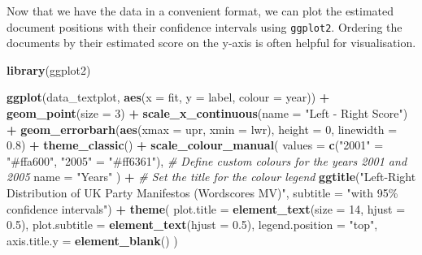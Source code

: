 \documentclass[
]{book}
\newenvironment{Shaded}{\begin{snugshade}}{\end{snugshade}}
\newcommand{\AttributeTok}[1]{\textcolor[rgb]{0.13,0.29,0.53}{#1}}
\newcommand{\CommentTok}[1]{\textcolor[rgb]{0.56,0.35,0.01}{\textit{#1}}}
\newcommand{\DecValTok}[1]{\textcolor[rgb]{0.00,0.00,0.81}{#1}}
\newcommand{\FloatTok}[1]{\textcolor[rgb]{0.00,0.00,0.81}{#1}}
\newcommand{\FunctionTok}[1]{\textcolor[rgb]{0.13,0.29,0.53}{\textbf{#1}}}
\newcommand{\NormalTok}[1]{#1}
\newcommand{\OtherTok}[1]{\textcolor[rgb]{0.56,0.35,0.01}{#1}}
\newcommand{\SpecialCharTok}[1]{\textcolor[rgb]{0.81,0.36,0.00}{\textbf{#1}}}
\newcommand{\StringTok}[1]{\textcolor[rgb]{0.31,0.60,0.02}{#1}}
\begin{document}
Now that we have the data in a convenient format, we can plot the estimated document positions with their confidence intervals using \texttt{ggplot2}. Ordering the documents by their estimated score on the y-axis is often helpful for visualisation.

\begin{Shaded}
\begin{Highlighting}[]
\FunctionTok{library}\NormalTok{(ggplot2)}

\FunctionTok{ggplot}\NormalTok{(data\_textplot, }\FunctionTok{aes}\NormalTok{(}\AttributeTok{x =}\NormalTok{ fit, }\AttributeTok{y =}\NormalTok{ label, }\AttributeTok{colour =}\NormalTok{ year)) }\SpecialCharTok{+}
  \FunctionTok{geom\_point}\NormalTok{(}\AttributeTok{size =} \DecValTok{3}\NormalTok{) }\SpecialCharTok{+}
  \FunctionTok{scale\_x\_continuous}\NormalTok{(}\AttributeTok{name =} \StringTok{"Left {-} Right Score"}\NormalTok{) }\SpecialCharTok{+}
  \FunctionTok{geom\_errorbarh}\NormalTok{(}\FunctionTok{aes}\NormalTok{(}\AttributeTok{xmax =}\NormalTok{ upr, }\AttributeTok{xmin =}\NormalTok{ lwr),}
                 \AttributeTok{height =} \DecValTok{0}\NormalTok{,}
                 \AttributeTok{linewidth =} \FloatTok{0.8}\NormalTok{) }\SpecialCharTok{+}
  \FunctionTok{theme\_classic}\NormalTok{() }\SpecialCharTok{+}
  \FunctionTok{scale\_colour\_manual}\NormalTok{(}
    \AttributeTok{values =} \FunctionTok{c}\NormalTok{(}\StringTok{"2001"} \OtherTok{=} \StringTok{"\#ffa600"}\NormalTok{, }\StringTok{"2005"} \OtherTok{=} \StringTok{"\#ff6361"}\NormalTok{),}
    \CommentTok{\# Define custom colours for the years 2001 and 2005}
    \AttributeTok{name =} \StringTok{"Years"}
\NormalTok{  ) }\SpecialCharTok{+} \CommentTok{\# Set the title for the colour legend}
  \FunctionTok{ggtitle}\NormalTok{(}\StringTok{"Left{-}Right Distribution of UK Party Manifestos (Wordscores MV)"}\NormalTok{,}
          \AttributeTok{subtitle =} \StringTok{"with 95\% confidence intervals"}\NormalTok{) }\SpecialCharTok{+}
  \FunctionTok{theme}\NormalTok{(}
    \AttributeTok{plot.title =} \FunctionTok{element\_text}\NormalTok{(}\AttributeTok{size =} \DecValTok{14}\NormalTok{, }\AttributeTok{hjust =} \FloatTok{0.5}\NormalTok{),}
    \AttributeTok{plot.subtitle =} \FunctionTok{element\_text}\NormalTok{(}\AttributeTok{hjust =} \FloatTok{0.5}\NormalTok{),}
    \AttributeTok{legend.position =} \StringTok{"top"}\NormalTok{,}
    \AttributeTok{axis.title.y =} \FunctionTok{element\_blank}\NormalTok{()}
\NormalTok{  )}
\end{Highlighting}
\end{Shaded}
\end{document}
